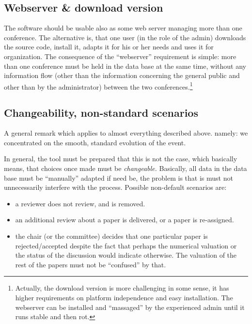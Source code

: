 \subsection{Webserver \& download version}
\label{sec:uses}


The software should be usable also as some web server managing more than
one conference. The alternative is, that one user (in the role of the
admin) downloads the source code, install it, adapts it for his or her
needs and uses it for organization.  The consequence of the ``webserver''
requirement is simple: more than one conference must be held in the data
base at the same time, without any information flow (other than the
information concerning the general public and other than by the
administrator) between the two conferences.\footnote{Actually, the download
  version is more challenging in some sense, it has higher requirements on
  platform independence and easy installation. The webserver can be
  installed and ``massaged'' by the experienced admin until it runs
  stable and then rot.}




\subsection{Changeability, non-standard scenarios}

A general remark which applies to almost everything described above.
namely: we concentrated on the smooth, standard evolution of the event.

In general, the tool must be prepared that this is not the case, which
basically means, that choices once made must be \emph{changeable.}
Basically, all data in the data base must be ``manually'' adapted if need
be, the problem is that is must not unnecessarily interfere with the
process. Possible non-default scenarios are:
\begin{itemize}
\item a reviewer does not review, and is removed.
\item an additional review about a paper is delivered, or a paper is re-assigned.
\item the chair (or the committee) decides that one particular paper is
  rejected/accepted despite the fact that perhaps the numerical valuation
  or the status of the discussion would indicate otherwise. The valuation
  of the rest of the papers must not be ``confused'' by that.
\end{itemize}











